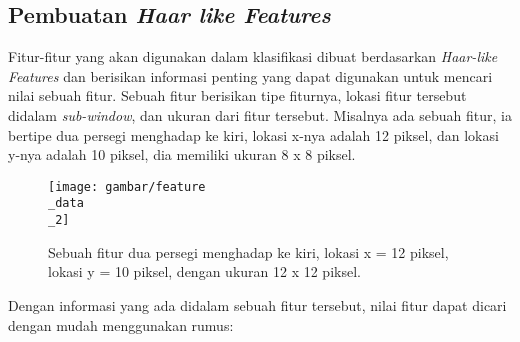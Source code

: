 

\subsection{Pembuatan \textit{Haar like Features}}

Fitur-fitur yang akan digunakan dalam klasifikasi dibuat 
berdasarkan \emph{Haar-like Features} dan berisikan informasi penting yang dapat digunakan 
untuk mencari nilai sebuah fitur. Sebuah fitur berisikan tipe fiturnya, lokasi fitur tersebut 
didalam \textit{sub-window}, dan ukuran dari fitur tersebut.
Misalnya ada sebuah fitur, ia bertipe dua persegi menghadap ke kiri, lokasi x-nya adalah 12 piksel, 
dan lokasi y-nya adalah 10 piksel, dia memiliki ukuran 8 x 8 piksel.

\begin{figure}[H]
  \centering{}
	\texttt{[image: gambar/feature\\\_data\\\_2]}
  \caption{Sebuah fitur dua persegi menghadap ke kiri, lokasi x = 12 piksel, 
  lokasi y = 10 piksel, dengan ukuran 12 x 12 piksel.}
\end{figure} 
Dengan informasi yang ada didalam sebuah fitur tersebut, nilai fitur dapat dicari dengan 
mudah menggunakan rumus:

